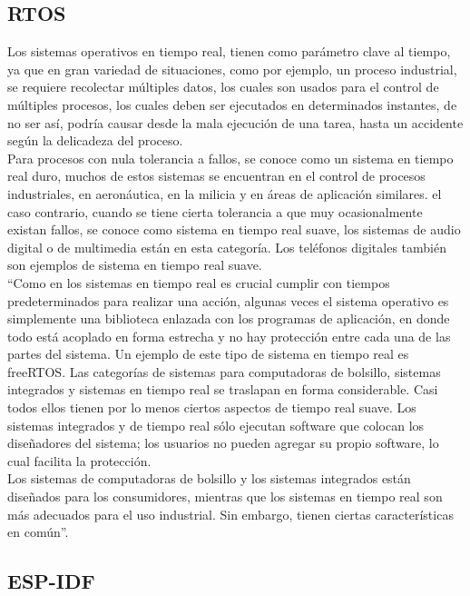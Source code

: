 \subsection{RTOS}

Los sistemas operativos en tiempo real, tienen como parámetro clave al tiempo, ya que en gran variedad de situaciones, como por ejemplo, un proceso industrial, se requiere recolectar múltiples datos, los cuales son usados para el control de múltiples procesos, los cuales deben ser ejecutados en determinados instantes, de no ser así, podría causar desde la mala ejecución de una tarea, hasta un accidente según la delicadeza del proceso.\\ 

Para procesos con nula tolerancia a fallos, se conoce como un sistema en tiempo real duro, muchos de estos sistemas se encuentran en el control de procesos industriales, en aeronáutica, en la milicia y en áreas de aplicación similares. el caso contrario, cuando se tiene cierta tolerancia a que muy ocasionalmente existan fallos, se conoce como sistema en tiempo real suave, los sistemas de audio digital o de multimedia están en esta categoría. Los teléfonos digitales también son ejemplos de sistema en tiempo real suave. \cite{SO} \\

``Como en los sistemas en tiempo real es crucial cumplir con tiempos predeterminados para realizar una acción, algunas veces el sistema operativo es simplemente una biblioteca enlazada con los programas de aplicación, en donde todo está acoplado en forma estrecha y no hay protección entre cada una de las partes del sistema. Un ejemplo de este tipo de sistema en tiempo real es freeRTOS.  Las categorías de sistemas para computadoras de bolsillo, sistemas integrados y sistemas en tiempo real se traslapan en forma considerable. Casi todos ellos tienen por lo menos ciertos aspectos de tiempo real suave. Los sistemas integrados y de tiempo real sólo ejecutan software que colocan los diseñadores del sistema; los usuarios no pueden agregar su propio software, lo cual facilita la protección. \\

Los sistemas de computadoras de bolsillo y los sistemas integrados están diseñados para los consumidores, mientras que los sistemas en tiempo real son más adecuados para el uso industrial. Sin embargo, tienen ciertas características en común''. \cite{SO}

\subsection{ESP-IDF}

